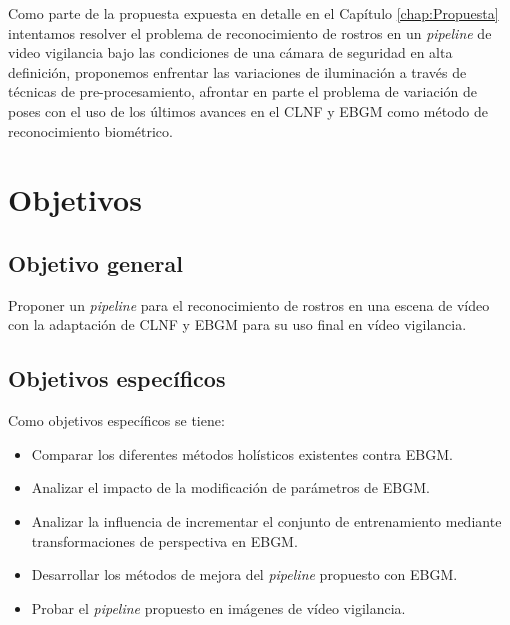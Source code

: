 Como parte de la propuesta expuesta en detalle en el Capítulo \ref{chap:Propuesta} intentamos resolver el problema de reconocimiento de rostros en un \textit{pipeline} de video vigilancia bajo las condiciones de una cámara de seguridad en alta definición, proponemos enfrentar las variaciones de iluminación a través de técnicas de pre-procesamiento, afrontar en parte el problema de variación de poses con el uso de los últimos avances en el \acf{CLNF} y \acf{EBGM} como método de reconocimiento biométrico. 

\section{Objetivos}\label{scc:Objetivos}

\subsection{Objetivo general}
Proponer un \textit{pipeline} para el reconocimiento de rostros en una escena de vídeo con la adaptación de \acf{CLNF} y \acf{EBGM} para su uso final en vídeo vigilancia.

\subsection{Objetivos específicos}
Como objetivos específicos se tiene:
\begin{itemize}
\item Comparar los diferentes métodos holísticos existentes contra \ac{EBGM}.
\item Analizar el impacto de la modificación de parámetros de \ac{EBGM}.
\item Analizar la influencia de incrementar el conjunto de entrenamiento mediante transformaciones de perspectiva en \ac{EBGM}.
\item Desarrollar los métodos de mejora del \textit{pipeline} propuesto con \ac{EBGM}.
\item Probar el \textit{pipeline} propuesto en imágenes de vídeo vigilancia.
\end{itemize}

